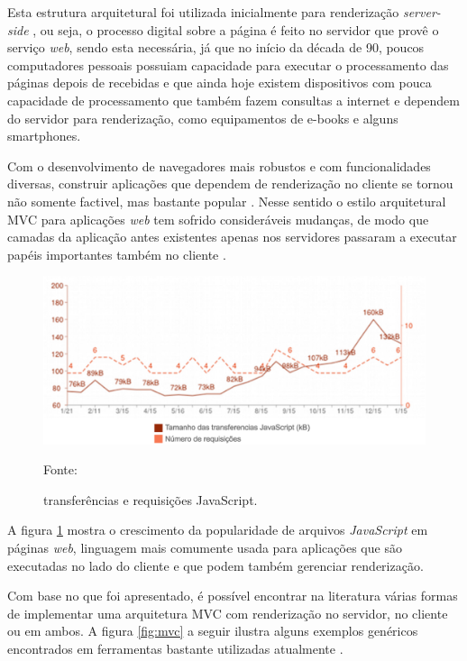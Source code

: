 Esta estrutura arquitetural foi utilizada inicialmente para renderização \textit{server-side} \cite{shabaitah2014}, ou seja, o processo digital sobre a página é feito no servidor que provê o serviço \textit{web}, sendo esta necessária, já que no início da década de 90, poucos computadores pessoais possuiam capacidade para executar o processamento das páginas depois de recebidas e que ainda hoje existem dispositivos com pouca capacidade de processamento que também fazem consultas a internet e dependem do servidor para renderização, como equipamentos de e-books e alguns smartphones\cite{baker2006}. 

Com o desenvolvimento de navegadores mais robustos e com funcionalidades diversas, construir aplicações que dependem de renderização no cliente se tornou não somente factivel, mas bastante popular \cite{google2015}. Nesse sentido o estilo arquitetural MVC para aplicações \textit{web} tem sofrido consideráveis mudanças, de modo que camadas da aplicação antes existentes apenas nos servidores passaram a executar papéis importantes também no cliente \cite{google2015}.

\begin{figure}[h!]
	\centering
  	\includegraphics[width=.9\linewidth]{figuras/jsdata.eps}
  	\caption{transferências e requisições JavaScript.}
	\small{Fonte: \cite{google2015}}
  	\label{fig:jsdata}
\end{figure}

A figura \ref{fig:jsdata} mostra o crescimento da popularidade de arquivos \textit{JavaScript} em páginas \textit{web}, linguagem mais comumente usada para aplicações que são executadas no lado do cliente e que podem também gerenciar renderização. 

Com base no que foi apresentado, é possível encontrar na literatura várias formas de implementar uma arquitetura MVC com renderização no servidor, no cliente ou em ambos. A figura \ref{fig:mvc} a seguir ilustra alguns exemplos genéricos encontrados em ferramentas bastante utilizadas atualmente \cite{mejia2011, petitit2014, quinn2015}. 

